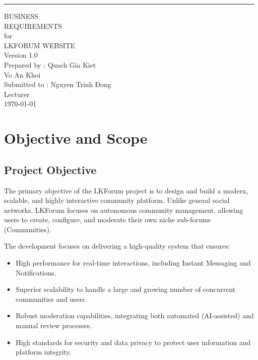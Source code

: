 \documentclass{scrreprt}
\date{}
\def\myversion{1.0 }
\begin{document}
\begin{flushright}
    \rule{16cm}{5pt}\vskip1cm
    \begin{bfseries}
        \Huge{BUSINESS\\ REQUIREMENTS}\\
        \vspace{1.5cm}
        for\\
        \vspace{1.5cm}
        LKFORUM WEBSITE\\
        \vspace{1.5cm}
        \LARGE{Version \myversion}\\
        \vspace{1.5cm}
        Prepared by : Quach Gia Kiet\\
        Vo An Khoi\\
        \vspace{1.5cm}
        Submitted to : Nguyen Trinh Đong \\Lecturer\\
        \vspace{1.5cm}
        \today\\
    \end{bfseries}
\end{flushright}

\tableofcontents

\chapter{Objective and Scope}

\section{Project Objective}
The primary objective of the LKForum project is to design and build a modern, scalable, and highly interactive community platform. Unlike general social networks, LKForum focuses on autonomous community management, allowing users to create, configure, and moderate their own niche sub-forums (Communities).

The development focuses on delivering a high-quality system that ensures:
\begin{itemize}
    \item High performance for real-time interactions, including Instant Messaging and Notifications.
    \item Superior scalability to handle a large and growing number of concurrent communities and users.
    \item Robust moderation capabilities, integrating both automated (AI-assisted) and manual review processes.
    \item High standards for security and data privacy to protect user information and platform integrity.
\end{itemize}
\end{document}
